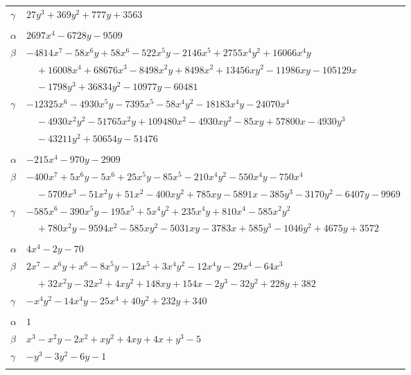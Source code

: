 \documentclass[11pt]{article}
\begin{document}
\begin{longtable}{@{}ll@{}}
$\gamma$ & $27y^{3}+369y^{2}+777y+3563$\\
\addlinespace[3pt]
\multicolumn{2}{@{}l}{$\{i,j\}=\{12,31\}$, $k_{ij}=2^{3}\cdot 3^{2}\cdot 7$}\\
$\alpha$ & $2697x^{4}-6728y-9509$\\
$\beta$ & $-4814x^{7}-58x^{6}y+58x^{6}-522x^{5}y-2146x^{5}+2755x^{4}y^{2}+16066x^{4}y$\\
 & $\quad +16008x^{4}+68676x^{3}-8498x^{2}y+8498x^{2}+13456xy^{2}-11986xy-105129x$\\
 & $\quad -1798y^{3}+36834y^{2}-10977y-60481$\\
$\gamma$ & $-12325x^{6}-4930x^{5}y-7395x^{5}-58x^{4}y^{2}-18183x^{4}y-24070x^{4}$\\
 & $\quad -4930x^{2}y^{2}-51765x^{2}y+109480x^{2}-4930xy^{2}-85xy+57800x-4930y^{3}$\\
 & $\quad -43211y^{2}+50654y-51476$\\
\addlinespace[3pt]
\multicolumn{2}{@{}l}{$\{i,j\}=\{12,37\}$, $k_{ij}=2^{2}\cdot 3\cdot 7$}\\
$\alpha$ & $-215x^{4}-970y-2909$\\
$\beta$ & $-400x^{7}+5x^{6}y-5x^{6}+25x^{5}y-85x^{5}-210x^{4}y^{2}-550x^{4}y-750x^{4}$\\
 & $\quad -5709x^{3}-51x^{2}y+51x^{2}-400xy^{2}+785xy-5891x-385y^{3}-3170y^{2}-6407y-9969$\\
$\gamma$ & $-585x^{6}-390x^{5}y-195x^{5}+5x^{4}y^{2}+235x^{4}y+810x^{4}-585x^{2}y^{2}$\\
 & $\quad +780x^{2}y-9594x^{2}-585xy^{2}-5031xy-3783x+585y^{3}-1046y^{2}+4675y+3572$\\
\addlinespace[3pt]
\multicolumn{2}{@{}l}{$\{i,j\}=\{12,39\}$, $k_{ij}=2^{3}\cdot 3^{2}\cdot 11$}\\
$\alpha$ & $4x^{4}-2y-70$\\
$\beta$ & $2x^{7}-x^{6}y+x^{6}-8x^{5}y-12x^{5}+3x^{4}y^{2}-12x^{4}y-29x^{4}-64x^{3}$\\
 & $\quad +32x^{2}y-32x^{2}+4xy^{2}+148xy+154x-2y^{3}-32y^{2}+228y+382$\\
$\gamma$ & $-x^{4}y^{2}-14x^{4}y-25x^{4}+40y^{2}+232y+340$\\
\addlinespace[3pt]
\multicolumn{2}{@{}l}{$\{i,j\}=\{13,17\}$, $k_{ij}=7$}\\
$\alpha$ & $1$\\
$\beta$ & $x^{3}-x^{2}y-2x^{2}+xy^{2}+4xy+4x+y^{3}-5$\\
$\gamma$ & $-y^{3}-3y^{2}-6y-1$\\
\addlinespace[3pt]

\end{longtable}
\end{document}
